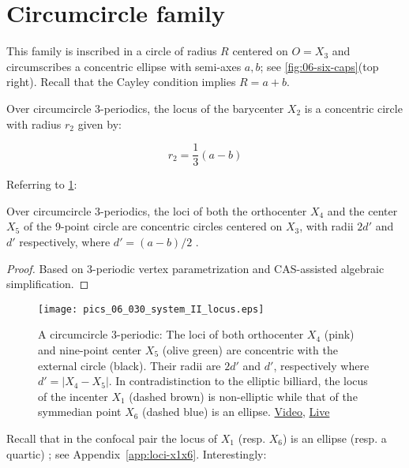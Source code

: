 \section{Circumcircle family}

This family is inscribed in a circle of radius $R$ centered on $O=X_3$ and circumscribes a concentric ellipse with semi-axes $a,b$; see     \cref{fig:06-six-caps}(top right). Recall that the Cayley condition implies $R=a+b$. 

\begin{proposition}
Over circumcircle 3-periodics, the locus of the barycenter $X_2$ is a concentric circle with radius $r_2$ given by:

\[ r_2 = \frac{1}{3}(a-b)  \]

\end{proposition}

Referring to \cref{fig:06-circum-x1456-loci}:

\begin{proposition}
Over circumcircle 3-periodics, the loci of both the orthocenter $X_4$ and the center $X_5$ of the 9-point circle are concentric circles centered on $X_3$, with radii $2 d'$ and $d'$ respectively, where $d'=(a-b)/2$ .
\label{prop:06-circum-x1456-loci}
\end{proposition}

\begin{proof}
Based on 3-periodic vertex parametrization and CAS-assisted algebraic simplification.
\end{proof}

\begin{figure}
    \centering
    \texttt{[image: pics\_06\_030\_system\_II\_locus.eps]}
    \caption{A circumcircle 3-periodic: The loci of both orthocenter $X_4$ (pink) and nine-point center $X_5$ (olive green) are concentric with the external circle (black). Their radii are $2d'$ and $d'$, respectively where $d'=|X_4-X_5|$. In contradistinction to the elliptic billiard, the locus of the incenter $X_1$ (dashed brown) is non-elliptic while that of the symmedian point $X_6$ (dashed blue) is an ellipse. \href{https://youtu.be/8xlYaQfQCTw}{Video}, \href{https://bit.ly/3vo8eWl}{Live}}
    \label{fig:06-circum-x1456-loci}
\end{figure}

Recall that in the confocal pair the locus of $X_1$ (resp. $X_6$) is an ellipse (resp. a quartic) \cite{garcia2020-ellipses}; see Appendix~\ref{app:loci-x1x6}. Interestingly:

